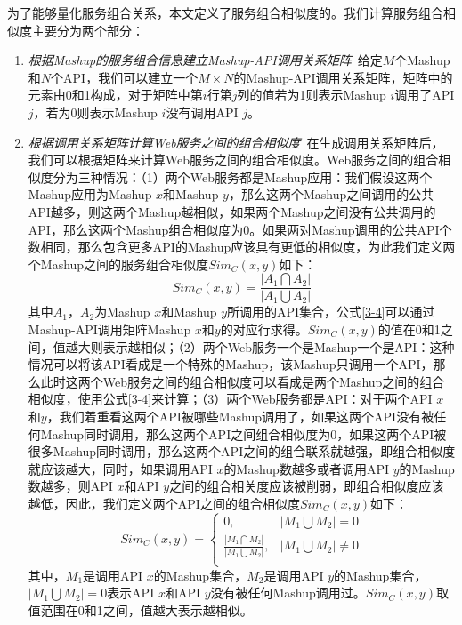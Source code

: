 \documentclass[master,winfonts]{njuthesis}
\begin{document}
为了能够量化服务组合关系，本文定义了服务组合相似度的。我们计算服务组合相似度主要分为两个部分：
\begin{enumerate}
\item \emph{根据Mashup的服务组合信息建立Mashup-API调用关系矩阵}~给定$M$个Mashup和$N$个API，我们可以建立一个$M \times N$的Mashup-API调用关系矩阵，矩阵中的元素由0和1构成，对于矩阵中第$i$行第$j$列的值若为1则表示Mashup $i$调用了API $j$，若为0则表示Mashup $i$没有调用API $j$。

\item \emph{根据调用关系矩阵计算Web服务之间的组合相似度}~在生成调用关系矩阵后，我们可以根据矩阵来计算Web服务之间的组合相似度。Web服务之间的组合相似度分为三种情况：（1）两个Web服务都是Mashup应用：我们假设这两个Mashup应用为Mashup $x$和Mashup $y$，那么这两个Mashup之间调用的公共API越多，则这两个Mashup越相似，如果两个Mashup之间没有公共调用的API，那么这两个Mashup组合相似度为0。如果两对Mashup调用的公共API个数相同，那么包含更多API的Mashup应该具有更低的相似度，为此我们定义两个Mashup之间的服务组合相似度$Sim_C(x,y)$如下：
\begin{equation}
Sim_C(x,y) = \frac{\left | A_1\bigcap A_2 \right |}{\left | A_1\bigcup A_2 \right |}\label{3-4}
\end{equation}
其中$A_1$，$A_2$为Mashup $x$和Mashup $y$所调用的API集合，公式\eqref{3-4}可以通过Mashup-API调用矩阵Mashup $x$和$y$的对应行求得。$Sim_C(x,y)$的值在0和1之间，值越大则表示越相似；（2）两个Web服务一个是Mashup一个是API：这种情况可以将该API看成是一个特殊的Mashup，该Mashup只调用一个API，那么此时这两个Web服务之间的组合相似度可以看成是两个Mashup之间的组合相似度，使用公式\eqref{3-4}来计算；（3）两个Web服务都是API：对于两个API $x$和$y$，我们着重看这两个API被哪些Mashup调用了，如果这两个API没有被任何Mashup同时调用，那么这两个API之间组合相似度为0，如果这两个API被很多Mashup同时调用，那么这两个API之间的组合联系就越强，即组合相似度就应该越大，同时，如果调用API $x$的Mashup数越多或者调用API $y$的Mashup数越多，则API $x$和API $y$之间的组合相关度应该被削弱，即组合相似度应该越低，因此，我们定义两个API之间的组合相似度$Sim_C(x,y)$如下：
\begin{equation}
Sim_C(x,y) = \left\{  
             \begin{array}{lr}  
             0, &\left | M_1\bigcup M_2 \right |=0\\  
             \frac{\left | M_1\bigcap M_2 \right |}{\left | M_1\bigcup M_2 \right |}, & \left | M_1\bigcup M_2 \right |\neq 0\\  
      
             \end{array}  
\right.
\end{equation}
其中，$M_1$是调用API $x$的Mashup集合，$M_2$是调用API $y$的Mashup集合，$\left | M_1\bigcup M_2 \right | =0$表示API $x$和API $y$没有被任何Mashup调用过。$Sim_C(x,y)$取值范围在0和1之间，值越大表示越相似。

\end{enumerate}
\end{document}
